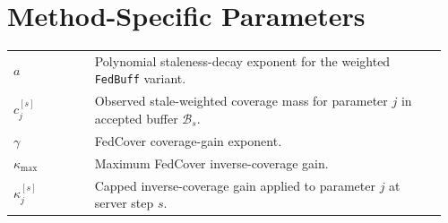 \section*{Method-Specific Parameters}
\vspace{-1em}
\begin{longtable}{@{} p{0.18\linewidth} p{0.78\linewidth} @{}}
$a$ & Polynomial staleness-decay exponent for the weighted \texttt{FedBuff} variant. \\
$c_j^{[s]}$ & Observed stale-weighted coverage mass for parameter $j$ in accepted buffer $\mathcal{B}_s$. \\
$\gamma$ & FedCover coverage-gain exponent. \\
$\kappa_{\max}$ & Maximum FedCover inverse-coverage gain. \\
$\kappa_j^{[s]}$ & Capped inverse-coverage gain applied to parameter $j$ at server step $s$. \\
\end{longtable}
